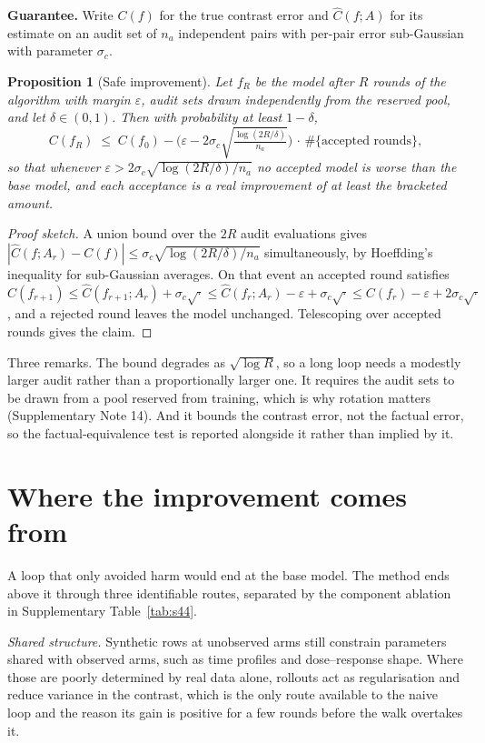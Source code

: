\documentclass[11pt,a4paper]{article}
\newtheorem{proposition}{Proposition}[section]
\begin{document}
\textbf{Guarantee.} Write $C(f)$ for the true contrast error and $\hat C(f;A)$ for its estimate on an audit set of $n_a$ independent pairs with per-pair error sub-Gaussian with parameter $\sigma_c$.
\begin{proposition}[Safe improvement]
Let $f_R$ be the model after $R$ rounds of the algorithm with margin $\varepsilon$, audit sets drawn independently from the reserved pool, and let $\delta\in(0,1)$. Then with probability at least $1-\delta$,
\begin{equation}
C(f_R)\;\le\;C(f_0)-\Big(\varepsilon-2\sigma_c\sqrt{\tfrac{\log(2R/\delta)}{n_a}}\Big)\,\cdot\,\#\{\text{accepted rounds}\},
\end{equation}
so that whenever $\varepsilon>2\sigma_c\sqrt{\log(2R/\delta)/n_a}$ no accepted model is worse than the base model, and each acceptance is a real improvement of at least the bracketed amount.
\end{proposition}
\begin{proof}[Proof sketch]
A union bound over the $2R$ audit evaluations gives $|\hat C(f;A_r)-C(f)|\le\sigma_c\sqrt{\log(2R/\delta)/n_a}$ simultaneously, by Hoeffding's inequality for sub-Gaussian averages. On that event an accepted round satisfies $C(f_{r+1})\le\hat C(f_{r+1};A_r)+\sigma_c\sqrt{\cdot}\le\hat C(f_r;A_r)-\varepsilon+\sigma_c\sqrt{\cdot}\le C(f_r)-\varepsilon+2\sigma_c\sqrt{\cdot}$, and a rejected round leaves the model unchanged. Telescoping over accepted rounds gives the claim.
\end{proof}
Three remarks. The bound degrades as $\sqrt{\log R}$, so a long loop needs a modestly larger audit rather than a proportionally larger one. It requires the audit sets to be drawn from a pool reserved from training, which is why rotation matters (Supplementary Note 14). And it bounds the contrast error, not the factual error, so the factual-equivalence test is reported alongside it rather than implied by it.

\section{Where the improvement comes from}
A loop that only avoided harm would end at the base model. The method ends above it through three identifiable routes, separated by the component ablation in Supplementary Table~\ref{tab:s44}.

\emph{Shared structure.} Synthetic rows at unobserved arms still constrain parameters shared with observed arms, such as time profiles and dose--response shape. Where those are poorly determined by real data alone, rollouts act as regularisation and reduce variance in the contrast, which is the only route available to the naive loop and the reason its gain is positive for a few rounds before the walk overtakes it.
\end{document}
